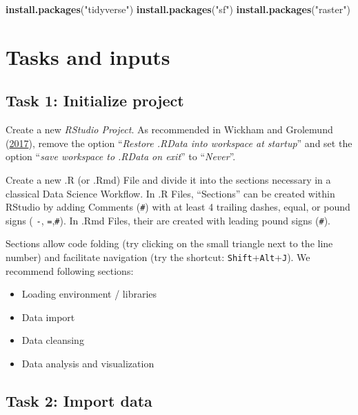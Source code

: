 \documentclass[]{book}
\newenvironment{Shaded}{\begin{snugshade}}{\end{snugshade}}
\newcommand{\KeywordTok}[1]{\textcolor[rgb]{0.13,0.29,0.53}{\textbf{#1}}}
\newcommand{\NormalTok}[1]{#1}
\newcommand{\StringTok}[1]{\textcolor[rgb]{0.31,0.60,0.02}{#1}}
\providecommand{\tightlist}{%
  \setlength{\itemsep}{0pt}\setlength{\parskip}{0pt}}
\begin{document}
\begin{Shaded}
\begin{Highlighting}[]
\KeywordTok{install.packages}\NormalTok{(}\StringTok{"tidyverse"}\NormalTok{)}
\KeywordTok{install.packages}\NormalTok{(}\StringTok{"sf"}\NormalTok{)}
\KeywordTok{install.packages}\NormalTok{(}\StringTok{"raster"}\NormalTok{)}
\end{Highlighting}
\end{Shaded}

\hypertarget{tasks-and-inputs}{%
\section{Tasks and inputs}\label{tasks-and-inputs}}

\hypertarget{task-1-initialize-project}{%
\subsection{Task 1: Initialize project}\label{task-1-initialize-project}}

Create a new \emph{RStudio Project}. As recommended in Wickham and Grolemund (\protect\hyperlink{ref-wickham2017}{2017}), remove the option ``\emph{Restore .RData into workspace at startup}'' and set the option ``\emph{save workspace to .RData on exit}'' to ``\emph{Never}''.

Create a new .R (or .Rmd) File and divide it into the sections necessary in a classical Data Science Workflow. In .R Files, ``Sections'' can be created within RStudio by adding Comments (\texttt{\#}) with at least 4 trailing dashes, equal, or pound signs ( \texttt{-}, \texttt{=},\texttt{\#}). In .Rmd Files, their are created with leading pound signs (\texttt{\#}).

Sections allow code folding (try clicking on the small triangle next to the line number) and facilitate navigation (try the shortcut: \texttt{Shift}+\texttt{Alt}+\texttt{J}). We recommend following sections:

\begin{itemize}
\tightlist
\item
  Loading environment / libraries
\item
  Data import
\item
  Data cleansing
\item
  Data analysis and visualization
\end{itemize}

\hypertarget{task-2-import-data}{%
\subsection{Task 2: Import data}\label{task-2-import-data}}
\end{document}
